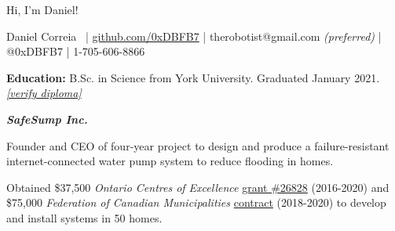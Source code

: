 \documentclass[fleqn,11pt]{article}
\newcommand{\ressection}[1]{\textbf{{\Large \textit{#1}}}\xrfill[0.1ex]{0.6pt}}
\begin{document}
\restoregeometry


\clearpage








\begingroup
{}\selectfont

{\Huge Hi, I'm Daniel!}

\endgroup


\begin{center}
\small{{Daniel Correia}\  | \href{https://github.com/0xDBFB7}{github.com/0xDBFB7} | therobotist@gmail.com \textit{(preferred)} | @0xDBFB7 | 1-705-606-8866}\\
\light{\makebox[\linewidth]{\rule{\textwidth}{0.4pt}}}
\end{center}


\begin{tcolorbox}
\textbf{Education:} B.Sc. in Science from York University. Graduated January 2021. \href{https://learner.mycreds.ca/#/sharelink/b664abe7-53a7-4d64-a0f1-bef16337edd0/57724eeb-34ab-4b79-b2a6-cd6bc311039e}{\textit{[verify diploma]}}
\end{tcolorbox}


\ressection{SafeSump Inc.}

Founder and CEO of four-year project to design and produce a failure-resistant internet-connected water pump system to reduce flooding in homes.

Obtained \$37,500 \textit{Ontario Centres of Excellence} \href{https://drive.google.com/file/d/1WXrxVwTggaL7WEvLv6DgJ891fSo7LqqP/view?usp=sharing}{grant \#26828} (2016-2020) and \$75,000 \textit{Federation of Canadian Municipalities} \href{https://drive.google.com/file/d/11pdJNzYDE-28X3m0rH8mE4cxoliTJZGH/view?usp=sharing}{contract} (2018-2020) to develop and install systems in 50 homes.
\end{document}
